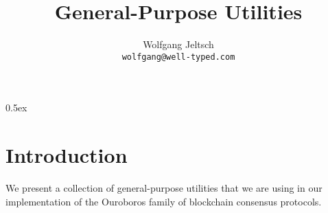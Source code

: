 \documentclass[a4paper,11pt]{article}
\begin{document}
\title{General-Purpose Utilities}
\author{Wolfgang Jeltsch\\\small\texttt{wolfgang@well-typed.com}}

\maketitle

\tableofcontents

\parindent 0pt\parskip 0.5ex

\section{Introduction}

We present a collection of general-purpose utilities that we are using in our implementation of the
Ouroboros family of blockchain consensus protocols.


\end{document}
